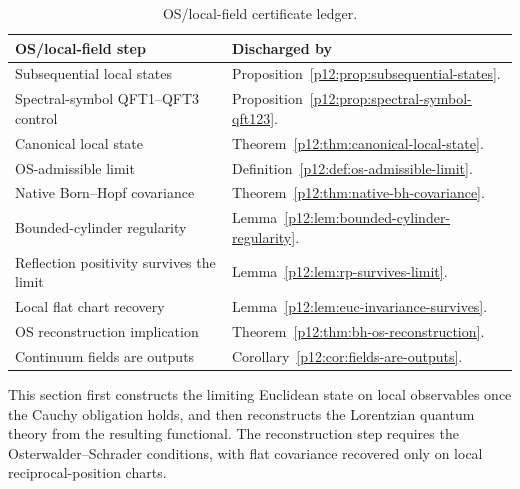 \documentclass[12pt,a4paper]{article}
\begin{document}
\begin{table}[htbp]
\centering
\small
\begin{tabularx}{\textwidth}{@{}
>{\raggedright\arraybackslash}p{}
>{\raggedright\arraybackslash}X
@{}}
\toprule
\textbf{OS/local-field step} & \textbf{Discharged by} \\
\midrule
Subsequential local states
& Proposition~\ref{p12:prop:subsequential-states}. \\

Spectral-symbol QFT1--QFT3 control
& Proposition~\ref{p12:prop:spectral-symbol-qft123}. \\

Canonical local state
& Theorem~\ref{p12:thm:canonical-local-state}. \\

OS-admissible limit
& Definition~\ref{p12:def:os-admissible-limit}. \\

Native Born--Hopf covariance
& Theorem~\ref{p12:thm:native-bh-covariance}. \\

Bounded-cylinder regularity
& Lemma~\ref{p12:lem:bounded-cylinder-regularity}. \\

Reflection positivity survives the limit
& Lemma~\ref{p12:lem:rp-survives-limit}. \\

Local flat chart recovery
& Lemma~\ref{p12:lem:euc-invariance-survives}. \\

OS reconstruction implication
& Theorem~\ref{p12:thm:bh-os-reconstruction}. \\

Continuum fields are outputs
& Corollary~\ref{p12:cor:fields-are-outputs}. \\
\bottomrule
\end{tabularx}
\caption[OS/local-field certificate ledger]{OS/local-field certificate ledger.}
\label{p12:tab:os-local-field-ledger}
\end{table}

This section first constructs the limiting Euclidean state on local observables once the Cauchy obligation holds, and then reconstructs the Lorentzian quantum theory from the resulting functional.  The reconstruction step requires the Osterwalder--Schrader conditions, with flat covariance recovered only on local reciprocal-position charts.
\end{document}
